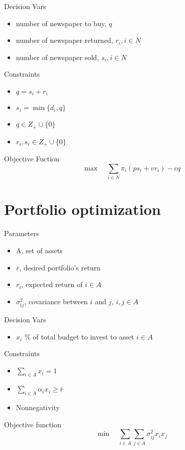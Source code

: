 			Decision Vars
			\begin{itemize}
				\item number of newspaper to buy, $q$
				\item number of newspaper returned, $r_i, i \in N$
				\item number of newspaper sold, $s_i, i\in N$
			\end{itemize}

			Constraints
			\begin{itemize}
				\item $q = s_i + r_i$
				\item $s_i = \min \{d_i, q\}$
				\item $q \in Z_+ \cup \{0\}$
				\item $r_i, s_i \in Z_+ \cup \{0\}$
			\end{itemize}

			Objective Fuction
			\begin{equation}
				\max \quad \sum_{i \in N} \pi_i (ps_i + vr_i) - cq
			\end{equation}

		\section{Portfolio optimization}
			Parameters
			\begin{itemize}
				\item A, set of assets
				\item $\bar{r}$, desired portfolio's return
				\item $r_i$, expected return of $i\in A$
				\item $\sigma_{ij}^2$, covariance between $i$ and $j$, $i, j \in A$
			\end{itemize}

			Decision Vars
			\begin{itemize}
				\item $x_i$ \% of total budget to invest to asset $i \in A$
			\end{itemize}

			Constraints
			\begin{itemize}
				\item $\sum_{i \in A} x_i = 1$
				\item $\sum_{i \in A} \alpha_i x_i \ge \bar{r}$
				\item Nonnegativity
			\end{itemize}

			Objective function
			\begin{equation}
				\min \quad \sum_{i \in A}\sum_{j \in A} \sigma_{ij}^2 x_i x_j
			\end{equation}

